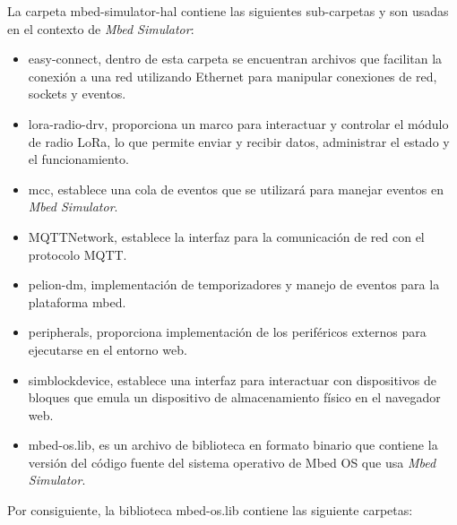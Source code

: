 La carpeta \textquotedbl mbed-simulator-hal\textquotedbl{}  contiene las siguientes sub-carpetas y son usadas en el contexto de \textit{Mbed Simulator}: 

\begin{itemize}
	\item easy-connect, dentro de esta carpeta se encuentran archivos que facilitan la conexión a una red utilizando Ethernet para manipular conexiones de red, sockets y eventos.
	
	\item lora-radio-drv, proporciona un marco para interactuar y controlar el módulo de radio LoRa, lo que permite enviar y recibir datos, administrar el estado y el funcionamiento.

	\item mcc, establece una cola de eventos que se utilizará para manejar eventos en \textit{Mbed Simulator}. 
	
	\item MQTTNetwork, establece la interfaz para la comunicación de red con el protocolo MQTT. 
	
	\item pelion-dm, implementación de temporizadores y manejo de eventos para la plataforma mbed.
	
	\item peripherals, proporciona implementación de los periféricos externos para ejecutarse en el entorno web.
	
	\item simblockdevice, establece una interfaz para interactuar con  dispositivos de bloques que emula un dispositivo de almacenamiento físico en el navegador web.
	
	\item mbed-os.lib, es un archivo de biblioteca en formato binario que contiene la versión del código fuente del sistema operativo de Mbed OS  que usa \textit{Mbed Simulator}.
	
\end{itemize}


Por consiguiente, la biblioteca \textquotedbl mbed-os.lib\textquotedbl{}  contiene las siguiente carpetas: 

